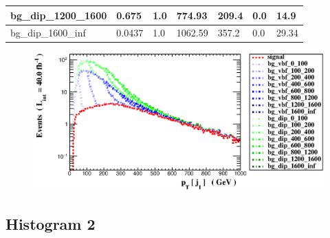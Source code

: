 \documentclass[a4paper, 10pt]{article}
\begin{document}
\begin{table}[H]
\begin{center}
\begin{tabular}{|m{23.0mm}|m{23.0mm}|m{18.0mm}|m{19.0mm}|m{19.0mm}|m{19.0mm}|m{19.0mm}|}
      \hline
      {\cellcolor{white}         bg\_dip\_1200\_1600}& {\cellcolor{white}         0.675}& {\cellcolor{white}         1.0}& {\cellcolor{white}         774.93}& {\cellcolor{white}         209.4}& {\cellcolor{orange}         0.0}& {\cellcolor{orange}         14.9}\\
      \hline
      {\cellcolor{white}         bg\_dip\_1600\_inf}& {\cellcolor{white}         0.0437}& {\cellcolor{white}         1.0}& {\cellcolor{white}         1062.59}& {\cellcolor{white}         357.2}& {\cellcolor{red}         0.0}& {\cellcolor{red}         29.34}\\
\hline
    \end{tabular}
  \end{center}
\end{table}

\begin{figure}[H]
  \begin{center}
    \includegraphics[scale=0.45]{selection_0.eps}\\
\caption{   }
  \end{center}
\end{figure}
      \newpage
\subsection{ Histogram 2}
\end{document}
